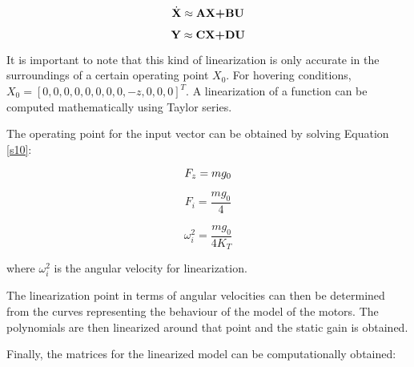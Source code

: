 \begin{equation}
\label{s1} 
 	\dot{\textbf{X}}\approx\textbf{AX+BU} \\
 \end{equation}

\begin{equation}
\label{s2} 
 	\textbf{Y}\approx\textbf{CX+DU} \\
 \end{equation}

It is important to note that this kind of linearization is only accurate in the surroundings of a certain operating point $X_{0}$. For hovering conditions, $X_{0}=[0, 0, 0, 0, 0, 0, 0, 0, -z, 0, 0, 0]^{T}$. A linearization of a function can be computed mathematically using Taylor series.

The operating point for the input vector can be obtained by solving Equation \ref{s10}:

\begin{equation}
\label{s10} 
 	F_{z}=mg_{0} \\
 \end{equation}
 
 \begin{equation}
\label{s11} 
 	F_{i}=\frac{mg_{0}}{4}
 \end{equation}
 
 \begin{equation}
\label{s12} 
 	\omega_{i}^{2}=\frac{mg_{0}}{4K_{T}}
 \end{equation}
 
where $\omega_{i}^{2}$ is the angular velocity for linearization.

The linearization point in terms of angular velocities can then be determined from the curves representing the behaviour of the model of the motors. The polynomials are then linearized around that point and the static gain is obtained.

Finally, the matrices for the linearized model can be computationally obtained:

\setcounter{MaxMatrixCols}{20}

